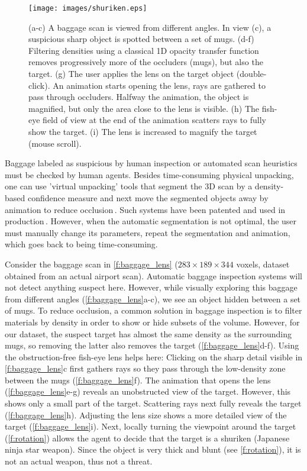 \begin{figure}
\centering
\texttt{[image: images/shuriken.eps]}

\caption[Using our interactive lens on baggage.]{(a-c) A baggage scan is viewed from different angles. In view (c), a suspicious sharp object is spotted between a set of mugs. (d-f) Filtering densities using a classical 1D opacity transfer function removes progressively more of the occluders (mugs), but also the target. (g) The user applies the lens on the target object (double-click). An animation starts opening the lens, rays are gathered to pass through occluders. Halfway the animation, the object is magnified, but only the area close to the lens is visible. (h) The fish-eye field of view at the end of the animation scatters rays to fully show the target. (i) The lens is increased to magnify the target (mouse scroll).}
\label{f:baggage_lens}
\end{figure}


Baggage labeled as suspicious by human inspection or automated scan heuristics must be checked by human agents. Besides time-consuming physical unpacking, one can use 'virtual unpacking' tools that segment the 3D scan by a density-based confidence measure and next move the segmented objects away by animation to reduce occlusion\,\cite{Li:2012:LVV:2425296.2425325}. Such systems have been patented and used in production\,\cite{patent}. However, when the automatic segmentation is not optimal, the user must manually change its parameters, repeat the segmentation and animation, which goes back to being time-consuming.

Consider the baggage scan in \autoref{f:baggage_lens} ($283 \times 189 \times 344$ voxels, dataset obtained from an actual airport scan). Automatic baggage inspection systems will not detect anything suspect here. However, while visually exploring this baggage from different angles (\autoref{f:baggage_lens}a-c), we see an object hidden between a set of mugs. To reduce occlusion, a common solution in baggage inspection is to filter materials by density in order to show or hide subsets of the volume. However, for our dataset, the suspect target has almost the same density as the surrounding mugs, so removing the latter also removes the target (\autoref{f:baggage_lens}d-f). Using the obstruction-free fish-eye lens helps here: Clicking on the sharp detail visible in \autoref{f:baggage_lens}c first gathers rays so they pass through the low-density zone between the mugs (\autoref{f:baggage_lens}f). The animation that opens the lens 
(\autoref{f:baggage_lens}e-g) reveals an unobstructed view of the target. However, this shows only a small part of the target. Scattering rays next fully reveals the target (\autoref{f:baggage_lens}h). Adjusting the lens size shows a more detailed view of the target (\autoref{f:baggage_lens}i). Next, locally turning the viewpoint around the target (\autoref{f:rotation}) allows the agent to decide that the target is a shuriken (Japanese ninja star weapon). Since the object is very thick and blunt (see \autoref{f:rotation}), it is not an actual weapon, thus not a threat.

